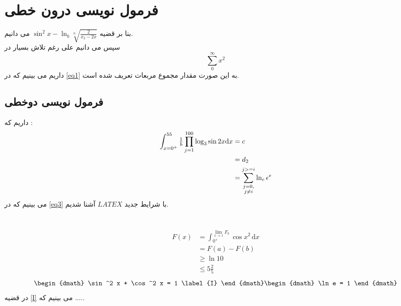 \documentclass{book}
\begin{document}
\chapter{فرمول نویسی درون خطی}
\BNaz
بنا بر قضیه 
$
\sin ^{2}x - \ln_b \sqrt[n]{\frac{2}{x_3 - 2x}}  
$
می دانیم.
\\
سپس می دانیم علی رغم تلاش بسیار در 
\begin{equation}\label{eq1}
	\sum_{0}^{\infty} x^2
\end{equation}
داریم می بینیم که در \eqref{eq1}
به این صورت مقدار مجموع مربعات تعریف شده است.
\section{فرمول نویسی دوخطی}

داریم که :
\begin{align} 
	\int_{x = 0^{+}}^{55} \tfrac{1}{b} \prod_{j = 1}^{100} \log_3 \sin 2x \mathrm{d}x & = c \notag \\
	& = d_{2} \label{eq2} \\
	& = \sum_{\substack{j = 0, \\ j \neq i}}^{j >= i} \ln_e \epsilon ^{e} \label{eq3} 
\end{align}
می بینیم که در \eqref{eq3}
با شرایط جدید $LATEX$ آشنا شدیم.

\chapter{}
\Time
{}
\section{}
\begin{equation} \label{eq4}
\begin{split}
	F(x) &= \int_{0^{+}}^{\lim_{x \to 1} F_b} \cos x^2  \, \mathrm{d} x \\
	&= F(a) - F(b) \\
	& \ge \ln 10 \\
	& \le 5\tfrac{2}{5}
\end{split}
\end{equation}
\BNaz
\begin{dgroup}
\begin{dmath}
   \sin ^2 x + \cos ^2 x = 1 \label{I}
\end{dmath}

\begin{dmath}
	\ln e = 1
\end{dmath}
\end{dgroup}
در قضیه \eqref{I}
می بینیم که .....
\end{document}
